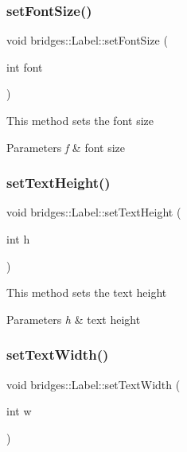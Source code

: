\subsubsection{\texorpdfstring{set\+Font\+Size()}{setFontSize()}}
{\footnotesize\ttfamily void bridges\+::\+Label\+::set\+Font\+Size (\begin{DoxyParamCaption}\item[{int}]{font }\end{DoxyParamCaption})\hspace{0.3cm}{\ttfamily [inline]}}

This method sets the font size


\begin{DoxyParams}{Parameters}
{\em f} & font size \\
\hline
\end{DoxyParams}
\mbox{\label{classbridges_1_1_label_a0f12dc8d5530ae4c66e2be4974284d2b}} 
\subsubsection{\texorpdfstring{set\+Text\+Height()}{setTextHeight()}}
{\footnotesize\ttfamily void bridges\+::\+Label\+::set\+Text\+Height (\begin{DoxyParamCaption}\item[{int}]{h }\end{DoxyParamCaption})\hspace{0.3cm}{\ttfamily [inline]}}

This method sets the text height


\begin{DoxyParams}{Parameters}
{\em h} & text height \\
\hline
\end{DoxyParams}
\mbox{\label{classbridges_1_1_label_ae7fc3629c3e1d18ceec6d96a9fa1f3a6}} 
\subsubsection{\texorpdfstring{set\+Text\+Width()}{setTextWidth()}}
{\footnotesize\ttfamily void bridges\+::\+Label\+::set\+Text\+Width (\begin{DoxyParamCaption}\item[{int}]{w }\end{DoxyParamCaption})\hspace{0.3cm}{\ttfamily [inline]}}

